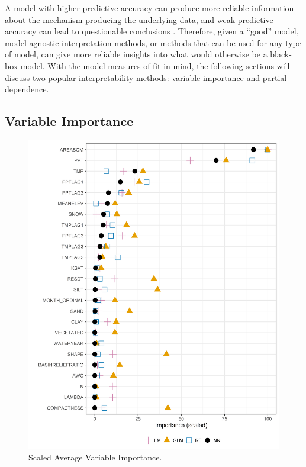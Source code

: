 A model with higher predictive accuracy can produce more reliable information about the mechanism producing the underlying data, and weak predictive accuracy can lead to questionable conclusions \cite{breiman2001statistical}. Therefore, given a ``good'' model, model-agnostic interpretation methods, or methods that can be used for any type of model, can give more reliable insights into what would otherwise be a black-box model. With the model measures of fit in mind, the following sections will discuss two popular interpretability methods: variable importance and partial dependence. 

\subsection{Variable Importance}

\begin{figure}
  	\centering
 	\includegraphics[width=\textwidth, trim={0 0 0 0}, clip=true]{plots/rplot213_vip_means.png}
	\caption{Scaled Average Variable Importance.}
	\label{fig:vipmeans}
\end{figure}


